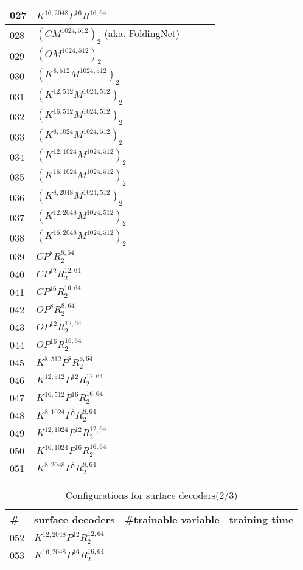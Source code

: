 \begin{appendices}
\begin{table*}
\begin{tabular}{| l | l | l | l }
		027&$K^{16,2048}P^{16}R^{16,64}$ &~&~\\
		\hline
		028&$(CM^{1024,512})_2$ (aka. FoldingNet\cite{foldingnet})&~&~\\
		029&$(OM^{1024,512})_2$ &~&~\\
		030&$(K^{8,512}M^{1024,512})_2$ &~&~\\
		031&$(K^{12,512}M^{1024,512})_2$ &~&~\\
		032&$(K^{16,512}M^{1024,512})_2$ &~&~\\
		033&$(K^{8,1024}M^{1024,512})_2$ &~&~\\
		034&$(K^{12,1024}M^{1024,512})_2$ &~&~\\
		035&$(K^{16,1024}M^{1024,512})_2$ &~&~\\
		036&$(K^{8,2048}M^{1024,512})_2$ &~&~\\
		037&$(K^{12,2048}M^{1024,512})_2$ &~&~\\
		038&$(K^{16,2048}M^{1024,512})_2$ &~&~\\
		039&$CP^8R^{8,64}_2$ &~&~\\
		040&$CP^{12}R^{12,64}_2$ &~&~\\
		041&$CP^{16}R^{16,64}_2$ &~&~\\
		042&$OP^8R^{8,64}_2$ &~&~\\
		043&$OP^{12}R^{12,64}_2$ &~&~\\
		044&$OP^{16}R^{16,64}_2$ &~&~\\
		045&$K^{8,512}P^{8}R^{8,64}_2$ &~&~\\
		046&$K^{12,512}P^{12}R^{12,64}_2$ &~&~\\
		047&$K^{16,512}P^{16}R^{16,64}_2$ &~&~\\
		048&$K^{8,1024}P^{8}R^{8,64}_2$ &~&~\\
		049&$K^{12,1024}P^{12}R^{12,64}_2$ &~&~\\
		050&$K^{16,1024}P^{16}R^{16,64}_2$ &~&~\\
		051&$K^{8,2048}P^{8}R^{8,64}_2$ &~&~\\
	\end{tabular}
\end{table*}
\begin{table*}
	\caption{Configurations for surface decoders(2/3)}
	\label{tab:surf_dec2}
	\centering
	\begin{tabular}{|l | l | l | l }
		\hline
		\hline
		\# & surface decoders & \#trainable variable & training time \\
		\hline
		052&$K^{12,2048}P^{12}R^{12,64}_2$ &~&~\\
		053&$K^{16,2048}P^{16}R^{16,64}_2$ &~&~\\

\end{tabular}
\end{table*}
\end{appendices}
